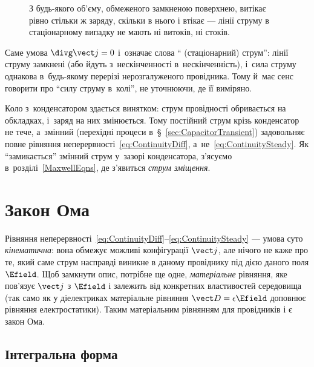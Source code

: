 \begin{figure}\centering
	\caption{З будь-якого об'єму, обмеженого замкненою поверхнею, витікає рівно стільки ж заряду, скільки в нього і втікає --- лінії струму в
стаціонарному випадку не мають ні витоків, ні стоків.}
\label{pic:stationaryn}
\end{figure}

Саме умова $\divg\vect j = 0$ і~означає слова \enquote{ (стаціонарний)
струм}: лінії струму замкнені (або йдуть з~нескінченності в~нескінченність), і~сила струму
однакова в~будь-якому перерізі нерозгалуженого провідника. Тому й~має сенс говорити про
\enquote{силу струму в~колі}, не уточнюючи, де її виміряно.

Коло з~конденсатором здається винятком: струм провідності обривається на обкладках, і~заряд
на них змінюється. Тому постійний струм крізь конденсатор не тече, а~змінний (перехідні
процеси в~\S~\ref{sec:CapacitorTransient}) задовольняє повне рівняння
неперервності~\eqref{eq:ContinuityDiff}, а~не~\eqref{eq:ContinuitySteady}. Як \enquote{замикається}
змінний струм у~зазорі конденсатора, з'ясуємо в~розділі~\ref{MaxwellEqns}, де з'явиться
\emph{струм зміщення}.

\section{Закон Ома}\label{sec:ohms-law}\hypertarget{ohms-law}{}

Рівняння неперервності~\eqref{eq:ContinuityDiff}--\eqref{eq:ContinuitySteady} --- умова суто \emph{кінематична}: вона обмежує можливі конфігурації
$\vect j$, але нічого не каже про те, який саме струм насправді виникне в даному провіднику під дією даного поля $\Efield$. Щоб замкнути опис,
потрібне ще одне, \emph{матеріальне} рівняння, яке пов'язує $\vect j$ з $\Efield$ і залежить від конкретних властивостей середовища (так само як у
діелектриках матеріальне рівняння $\vect D = \epsilon\Efield$ доповнює рівняння електростатики). Таким матеріальним рівнянням для провідників і є
закон Ома.

\subsection*{Інтегральна форма}

